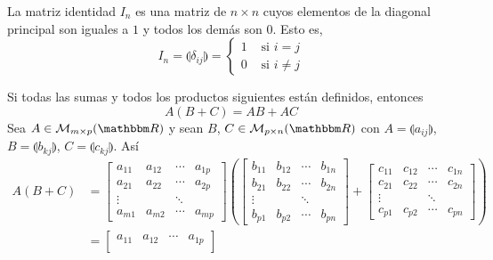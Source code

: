 \begin{definition}
    La matriz identidad $I_n$ es una matriz de $n \times n$ cuyos elementos de la diagonal principal son iguales a $1$ y todos los demás son $0$. Esto es,
    $$I_n = \llparenthesis \delta_{ij} \rrparenthesis = \begin{cases}
        1 & \text{ si } i = j \\
        0 & \text{ si } i \neq j
    \end{cases}$$
\end{definition}

\begin{theorem}
    Si todas las sumas y todos los productos siguientes están definidos, entonces
    $$A(B + C) = AB + AC$$
    \demostracion
    Sea $A \in \mathcal{M}_{m \times p}(\RR)$ y sean $B$, $C \in \mathcal{M}_{p \times n}(\RR)$ con $A = \llparenthesis a_{ij} \rrparenthesis$, $B = \llparenthesis b_{kj} \rrparenthesis$, $C = \llparenthesis c_{kj} \rrparenthesis$. Así
    \begin{align*}
        A(B + C) & = \begin{bmatrix}
            a_{11} & a_{12} & \cdots & a_{1p}\\
            a_{21} & a_{22} & \cdots & a_{2p}\\
            \vdots &  & \ddots & \\
            a_{m1} & a_{m2} & \cdots & a_{mp}
        \end{bmatrix} \left( \begin{bmatrix}
            b_{11} & b_{12} & \cdots & b_{1n}\\
            b_{21} & b_{22} & \cdots & b_{2n}\\
            \vdots &  & \ddots & \\
            b_{p1} & b_{p2} & \cdots & b_{pn}
        \end{bmatrix} + \begin{bmatrix}
            c_{11} & c_{12} & \cdots & c_{1n}\\
            c_{21} & c_{22} & \cdots & c_{2n}\\
            \vdots &  & \ddots & \\
            c_{p1} & c_{p2} & \cdots & c_{pn}
        \end{bmatrix} \right) \\
        & = \begin{bmatrix}
            a_{11} & a_{12} & \cdots & a_{1p}\\

\end{bmatrix}
\end{align*}
\end{theorem}
